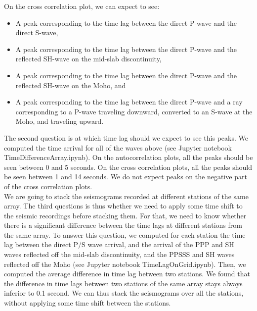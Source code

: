\documentclass[main.tex]{subfiles}
\begin{document}
On the cross correlation plot, we can expect to see:
\begin{itemize}
\item A peak corresponding to the time lag between the direct P-wave and the direct S-wave,
\item A peak corresponding to the time lag between the direct P-wave and the reflected SH-wave on the mid-slab discontinuity,
\item A peak corresponding to the time lag between the direct P-wave and the reflected SH-wave on the Moho, and
\item A peak corresponding to the time lag between the direct P-wave and a ray corresponding to a P-wave traveling downward, converted to an S-wave at the Moho, and traveling upward.
\end{itemize}

The second question is at which time lag should we expect to see this peaks. We computed the time arrival for all of the waves above (see Jupyter notebook TimeDifferenceArray.ipynb). On the autocorrelation plots, all the peaks should be seen between 0 and 5 seconds. On the cross correlation plots, all the peaks should be seen between 1 and 14 seconds. We do not expect peaks on the negative part of the cross correlation plots. \\

We are going to stack the seismograms recorded at different stations of the same array. The third questions is thus whether we need to apply some time shift to the seismic recordings before stacking them. For that, we need to know whether there is a significant difference between the time lags at different stations from the same array. To answer this question, we computed for each station the time lag between the direct P/S wave arrival, and the arrival of the PPP and SH waves reflected off the mid-slab discontinuity, and the PPSSS and SH waves reflected off the Moho (see Jupyter notebook TimeLagOnGrid.ipynb). Then, we computed the average difference in time lag between two stations. We found that the difference in time lags between two stations of the same array stays always inferior to 0.1 second. We can thus stack the seismograms over all the stations, without applying some time shift between the stations. \\
\end{document}
